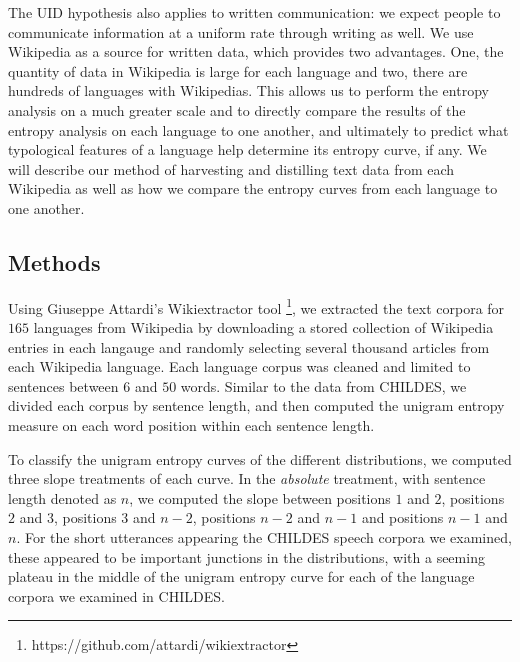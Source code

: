 \documentclass[10pt, letterpaper]{article}
\begin{document}
The UID hypothesis also applies to written communication: we expect
people to communicate information at a uniform rate through writing as
well. We use Wikipedia as a source for written data, which provides two
advantages. One, the quantity of data in Wikipedia is large for each
language and two, there are hundreds of languages with Wikipedias. This
allows us to perform the entropy analysis on a much greater scale and to
directly compare the results of the entropy analysis on each language to
one another, and ultimately to predict what typological features of a
language help determine its entropy curve, if any. We will describe our
method of harvesting and distilling text data from each Wikipedia as
well as how we compare the entropy curves from each language to one
another.

\subsection{Methods}\label{methods-1}

Using Giuseppe Attardi's Wikiextractor tool
\footnote{https://github.com/attardi/wikiextractor}, we extracted the
text corpora for \(165\) languages from Wikipedia by downloading a
stored collection of Wikipedia entries in each langauge and randomly
selecting several thousand articles from each Wikipedia language. Each
language corpus was cleaned and limited to sentences between \(6\) and
\(50\) words. Similar to the data from CHILDES, we divided each corpus
by sentence length, and then computed the unigram entropy measure on
each word position within each sentence length.

To classify the unigram entropy curves of the different distributions,
we computed three slope treatments of each curve. In the \emph{absolute}
treatment, with sentence length denoted as \(n\), we computed the slope
between positions \(1\) and \(2\), positions \(2\) and \(3\), positions
\(3\) and \(n-2\), positions \(n-2\) and \(n-1\) and positions \(n-1\)
and \(n\). For the short utterances appearing the CHILDES speech corpora
we examined, these appeared to be important junctions in the
distributions, with a seeming plateau in the middle of the unigram
entropy curve for each of the language corpora we examined in CHILDES.
\end{document}
